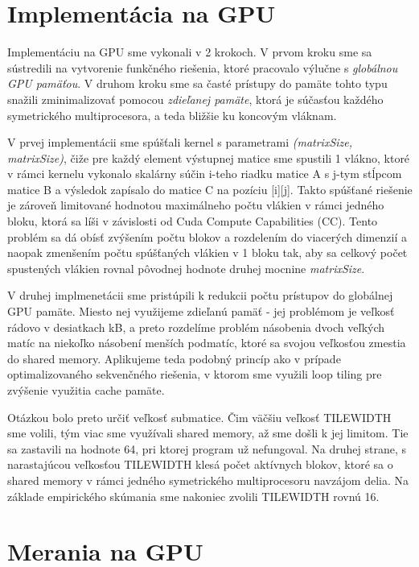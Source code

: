 \documentclass[slovak]{article}
\begin{document}
\section{Implementácia na GPU}

Implementáciu na GPU sme vykonali v 2 krokoch. V prvom kroku sme sa sústredili na vytvorenie funkčného riešenia, ktoré pracovalo výlučne s \emph{globálnou GPU pamäťou}. V druhom kroku sme sa časté prístupy do pamäte tohto typu snažili zminimalizovať pomocou \emph{zdieľanej pamäte}, ktorá je súčasťou každého symetrického multiprocesora, a teda bližšie ku koncovým vláknam.

V prvej implementácii sme spúšťali kernel s parametrami \emph{(matrixSize, matrixSize)}, čiže pre každý element výstupnej matice sme spustili 1 vlákno, ktoré v rámci kernelu vykonalo skalárny súčin i-teho riadku matice A s j-tym stĺpcom matice B a výsledok zapísalo do matice C na pozíciu [i][j]. Takto spúšťané riešenie je zároveň limitované hodnotou maximálneho počtu vlákien v rámci jedného bloku, ktorá sa líši v závislosti od Cuda Compute Capabilities (CC). Tento problém sa dá obísť zvýšením počtu blokov a rozdelením do viacerých dimenzií a naopak zmenšením počtu spúšťaných vlákien v 1 bloku tak, aby sa celkový počet spustených vlákien rovnal pôvodnej hodnote druhej mocnine \emph{matrixSize}.

V druhej implmenetácii sme pristúpili k redukcii počtu prístupov do globálnej GPU pamäte. Miesto nej využijeme zdieľanú pamäť - jej problémom je veľkosť rádovo v desiatkach kB, a preto rozdelíme problém násobenia dvoch veľkých matíc na niekoľko násobení menších podmatíc, ktoré sa svojou veľkosťou zmestia do shared memory. Aplikujeme teda podobný princíp ako v prípade optimalizovaného sekvenčného riešenia, v ktorom sme využili loop tiling pre zvýšenie využitia cache pamäte.

Otázkou bolo preto určiť veľkosť submatice. Čim väčšiu veľkosť TILE\textunderscore WIDTH sme volili, tým viac sme využívali shared memory, až sme došli k jej limitom. Tie sa zastavili na hodnote 64, pri ktorej program už nefungoval. Na druhej strane, s narastajúcou veľkosťou TILE\textunderscore WIDTH klesá počet aktívnych blokov, ktoré sa o shared memory v rámci jedného symetrického multiprocesoru navzájom delia. Na základe empirického skúmania sme nakoniec zvolili TILE\textunderscore WIDTH rovnú 16.

\section{Merania na GPU}
\end{document}
